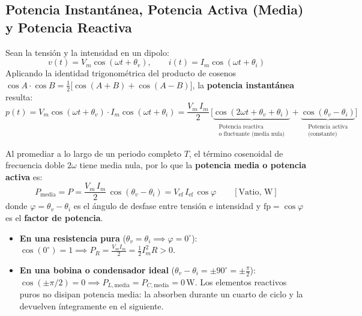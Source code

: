 \subsection{Potencia Instantánea, Potencia Activa (Media) y Potencia Reactiva}

Sean la tensión y la intensidad en un dipolo:
\begin{equation}
    v(t) = V_m\cos(\omega t + \theta_v), \qquad i(t) = I_m\cos(\omega t + \theta_i)
\end{equation}
Aplicando la identidad trigonométrica del producto de cosenos $\cos A\cdot\cos B = \frac{1}{2}\big[\cos(A+B) + \cos(A-B)\big]$, la \textbf{potencia instantánea} resulta:
\begin{equation}
    \boxed{p(t) = V_m\cos(\omega t + \theta_v)\cdot I_m\cos(\omega t + \theta_i) = \frac{V_m\,I_m}{2}\,\Big[\underbrace{\cos(2\omega t + \theta_v + \theta_i)}_{\substack{\text{Potencia reactiva}\\\text{o fluctuante (media nula)}}} + \underbrace{\cos(\theta_v - \theta_i)}_{\substack{\text{Potencia activa}\\\text{(constante)}}}\Big]}
\end{equation}

Al promediar a lo largo de un periodo completo $T$, el término cosenoidal de frecuencia doble $2\omega$ tiene media nula, por lo que la \textbf{potencia media o potencia activa} es:
\begin{equation}
    \boxed{P_{\text{media}} = P = \frac{V_m\,I_m}{2}\,\cos(\theta_v - \theta_i) = V_{\text{ef}}\,I_{\text{ef}}\,\cos\varphi} \qquad [\text{Vatio, }\si{\watt}]
\end{equation}
donde $\varphi = \theta_v - \theta_i$ es el ángulo de desfase entre tensión e intensidad y $\text{fp} = \cos\varphi$ es el \textbf{factor de potencia}.
\begin{itemize}
    \item \textbf{En una resistencia pura} ($\theta_v = \theta_i \implies \varphi = 0^\circ$): $\cos(0^\circ) = 1 \implies P_R = \frac{V_m I_m}{2} = \frac{1}{2}I_m^2 R > 0$.
    \item \textbf{En una bobina o condensador ideal} ($\theta_v - \theta_i = \pm 90^\circ = \pm \frac{\pi}{2}$): $\cos(\pm\pi/2) = 0 \implies \boxed{P_{L,\text{media}} = P_{C,\text{media}} = 0\,\si{\watt}}$. Los elementos reactivos puros no disipan potencia media: la absorben durante un cuarto de ciclo y la devuelven íntegramente en el siguiente.
\end{itemize}

